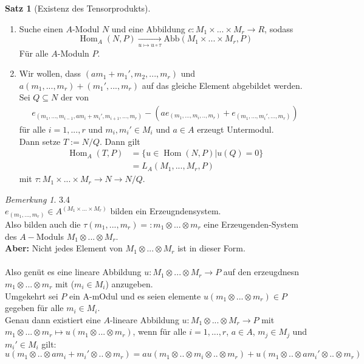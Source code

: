 \documentclass[10pt,a4paper]{article}
\newcommand{\Hom}{\operatorname{Hom}}
\newcounter{thm}[section]
\theoremstyle{definition}
\newtheorem{satz}[thm]{Satz}
\theoremstyle{plain}
\theoremstyle{remark}
\newtheorem{bem}[thm]{Bemerkung}
\begin{document}
\begin{satz}[Existenz des Tensorprodukts]
	\begin{enumerate}
		\item Suche einen $A$-Modul $N$ und eine Abbildung $c:M_1\times...\times M_r\rightarrow R$, sodass
		\[\Hom_A(N,P)\xrightarrow[u\mapsto u\circ\tau]{ }\text{Abb}(M_1\times...\times M_r,P)\]
		Für alle $A$-Moduln $P$.
		\item Wir wollen, dass $(am_1+m_1',m_2,...,m_r)$ und $a(m_1,...,m_r)+(m_1',...,m_r)$ auf das gleiche Element abgebildet werden.\\
		Sei $Q\subseteq N$ der von
		\begin{align*}
		e_{(m_1,...,m_{i-1},am_i+m_i',m_{i+1},...,m_r)}-\left(ae_{(m_1,...,m_i,..,m_r)}+e_{(m_1,...,m_i',...,m_r)}\right)
		\end{align*}
		für alle $i=1,...,r$ und $m_i,m_i'\in M_i$ und $a\in A$ erzeugt Untermodul.\\
		Dann setze $T:=N/Q$. Dann gilt
		\begin{align*}
		\Hom_A(T,P)&=\{u\in \Hom(N,P)|u(Q)=0\}\\
		&=L_A(M_1,...,M_r,P)
		\end{align*}
		mit $\tau:M_1\times...\times M_r\rightarrow N\rightarrow N/Q$.
	\end{enumerate}
\end{satz}
\begin{bem}
	3.4\\
	$e_{(m_1,...,m_r)}\in A^{(M_1\times...\times M_r)}$ bilden ein Erzeugndensystem.\\
	Also bilden auch die $\tau(m_1,...,m_r)=:m_1\otimes...\otimes m_r$ eine Erzeugenden-System des $A-$Moduls $M_1\otimes...\otimes M_r$.\\
	\textbf{Aber:} Nicht jedes Element von $M_1\otimes...\otimes M_r$ ist in dieser Form.\\
	\\
	Also genüt es eine lineare Abbildung $u:M_1\otimes...\otimes M_r\rightarrow P$ auf den erzeugdnesn $m_1\otimes...\otimes m_r$ mit ($m_i\in M_i$) anzugeben.\\
	Umgekehrt sei $P$ ein A-mOdul und es seien elemente $u(m_1\otimes...\otimes m_r)\in P$ gegeben für alle $m_i\in M_i$.\\
	Genau dann existiert eine $A$-lineare Abbildung $u:M_1\otimes...\otimes M_r\rightarrow P$ mit $m_1\otimes ...\otimes m_r\mapsto u(m_1\otimes ...\otimes m_r)$, wenn für alle $i=1,...,r$, $a\in A$, $m_j\in M_j$ und $m_i'\in M_i$ gilt:
	\[u(m_1\otimes ..\otimes a m_i+m_i'\otimes..\otimes m_r)=a u(m_1\otimes ..\otimes m_i\otimes..\otimes m_r)+u(m_1\otimes ..\otimes a m_i'\otimes..\otimes m_r)\]
\end{bem}
\end{document}

